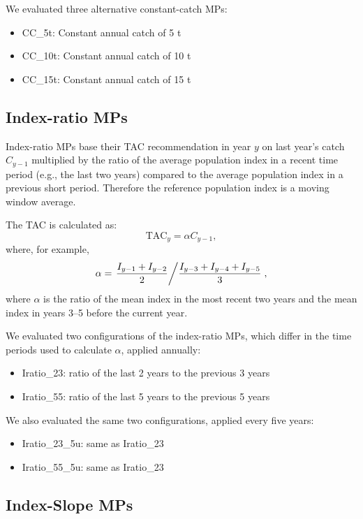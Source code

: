\documentclass[11pt]{book}
\begin{document}
\hypertarget{sec:mp-cc}{%
\label{sec:mp-cc}}

We evaluated three alternative constant-catch MPs:
\begin{itemize}

\item
  CC\_5t: Constant annual catch of 5 t
\item
  CC\_10t: Constant annual catch of 10 t
\item
  CC\_15t: Constant annual catch of 15 t
\end{itemize}
\hypertarget{sec:mp-ibased}{%
\label{sec:mp-ibased}}

\hypertarget{sec:mp-iratio}{%
\subsection{Index-ratio MPs}\label{sec:mp-iratio}}

Index-ratio MPs base their TAC recommendation in year \(y\) on last year's catch \(C_{y-1}\) multiplied by the ratio of the average population index in a recent time period (e.g., the last two years) compared to the average population index in a previous short period. Therefore the reference population index is a moving window average.

The TAC is calculated as:
\begin{equation}
\textrm{TAC}_y = \alpha C_{y-1},
\end{equation}
where, for example,
\begin{equation}
\alpha =
\left. \frac{I_{y-1} + I_{y-2}} {2} \middle/
\frac{I_{y-3} + I_{y-4} + I_{y-5}} {3} \right. ,
\end{equation}
where \(\alpha\) is the ratio of the mean index in the most recent two years and the mean index in years 3--5 before the current year.

We evaluated two configurations of the index-ratio MPs, which differ in the time periods used to calculate \(\alpha\), applied annually:
\begin{itemize}
\item
  Iratio\_23: ratio of the last 2 years to the previous 3 years
\item
  Iratio\_55: ratio of the last 5 years to the previous 5 years
\end{itemize}
We also evaluated the same two configurations, applied every five years:
\begin{itemize}
\item
  Iratio\_23\_5u: same as Iratio\_23
\item
  Iratio\_55\_5u: same as Iratio\_23
\end{itemize}
\hypertarget{sec:mp-islope}{%
\subsection{Index-Slope MPs}\label{sec:mp-islope}}
\end{document}
